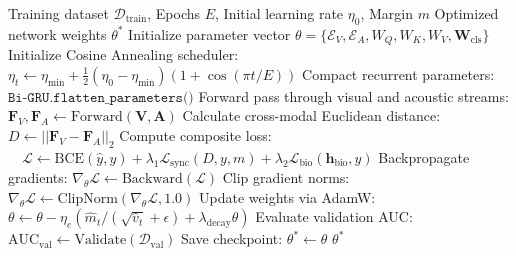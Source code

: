 \documentclass[journal]{IEEEtran}
\begin{document}
\begin{algorithm}[!t]
\caption{Adaptive Multi-Modal Gradient Optimization and Margin Scaling}
\label{alg:optimization}
\begin{algorithmic}[1]
\REQUIRE Training dataset $\mathcal{D}_{\text{train}}$, Epochs $E$, Initial learning rate $\eta_0$, Margin $m$
\ENSURE Optimized network weights $\theta^*$
\STATE Initialize parameter vector $\theta = \{\mathcal{E}_V, \mathcal{E}_A, W_Q, W_K, W_V, \mathbf{W}_{\text{cls}}\}$
\STATE Initialize Cosine Annealing scheduler: $\eta_t \leftarrow \eta_{\min} + \frac{1}{2}(\eta_0 - \eta_{\min})(1 + \cos(\pi t / E))$
        \STATE Compact recurrent parameters: $\texttt{Bi-GRU.flatten\_parameters()}$
        \STATE Forward pass through visual and acoustic streams: $\mathbf{F}_V, \mathbf{F}_A \leftarrow \text{Forward}(\mathbf{V}, \mathbf{A})$
        \STATE Calculate cross-modal Euclidean distance: $D \leftarrow ||\mathbf{F}_V - \mathbf{F}_A||_2$
        \STATE Compute composite loss:
        \STATE $\quad \mathcal{L} \leftarrow \text{BCE}(\hat{y}, y) + \lambda_1 \mathcal{L}_{\text{sync}}(D, y, m) + \lambda_2 \mathcal{L}_{\text{bio}}(\mathbf{h}_{\text{bio}}, y)$
        \STATE Backpropagate gradients: $\nabla_\theta \mathcal{L} \leftarrow \text{Backward}(\mathcal{L})$
        \STATE Clip gradient norms: $\nabla_\theta \mathcal{L} \leftarrow \text{ClipNorm}(\nabla_\theta \mathcal{L}, 1.0)$
        \STATE Update weights via AdamW: $\theta \leftarrow \theta - \eta_e (\hat{m}_t / (\sqrt{\hat{v}_t} + \epsilon) + \lambda_{\text{decay}} \theta)$
    \ENDFOR
    \STATE Evaluate validation AUC: $\text{AUC}_{\text{val}} \leftarrow \text{Validate}(\mathcal{D}_{\text{val}})$
        \STATE Save checkpoint: $\theta^* \leftarrow \theta$
    \ENDIF
\ENDFOR
\RETURN $\theta^*$
\end{algorithmic}
\end{algorithm}
\end{document}
